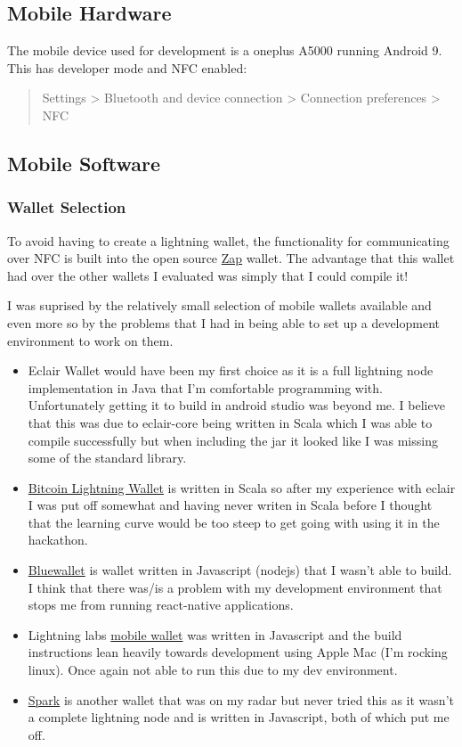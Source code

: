 \documentclass[a4paper]{article}
\begin{document}
\subsection{Mobile Hardware}
The mobile device used for development is a oneplus A5000 running Android 9.  This has
developer mode and NFC enabled:
\begin{quote}
Settings > Bluetooth and device connection > Connection preferences > NFC
\end{quote}

\subsection{Mobile Software}
\subsubsection{Wallet Selection}
To avoid having to create a lightning wallet, the functionality for communicating over
NFC is built into the open source \href{https://github.com/LN-Zap/zap-android}{Zap}
wallet.  The advantage that this wallet had over the other wallets I evaluated was
simply that I could compile it!

I was suprised by the relatively small selection of mobile wallets available and
even more so by the problems that I had in being able to set up a development
environment to work on them.

\begin{itemize}
\item Eclair Wallet would have been my first choice as it is a full lightning node
implementation in Java that I'm comfortable programming with.  Unfortunately getting it
to build in android studio was beyond me.  I believe that this was due to eclair-core
being written in Scala which I was able to compile successfully but when including the
jar it looked like I was missing some of the standard library.

\item \href{https://github.com/btcontract/lnwallet}{Bitcoin Lightning Wallet} is written
in Scala so after my experience with eclair I was put off somewhat and having never
writen in Scala before I thought that the learning curve would be too steep to get going
with using it in the hackathon.

\item \href{https://github.com/bluewallet/bluewallet}{Bluewallet} is wallet written in
Javascript (nodejs) that I wasn't able to build. I think that there was/is a problem
with my development environment that stops me from running react-native applications.

\item Lightning labs \href{https://github.com/lightninglabs/lightning-app}{mobile wallet}
was written in Javascript and the build instructions lean heavily towards development
using Apple Mac (I'm rocking linux). Once again not able to run this due to my dev
environment.

\item \href{}{Spark} is another wallet that was on my radar but never tried this as it
wasn't a complete lightning node and is written in Javascript, both of which put me off.
\end{itemize}
\end{document}
